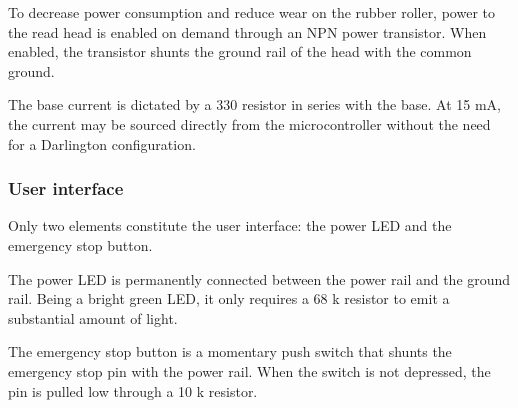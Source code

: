 \documentclass{article}
\begin{document}
	To decrease power consumption and reduce wear on the rubber roller, power
	to the read head is enabled on demand through an NPN power transistor.
	When enabled, the transistor shunts the ground rail of the head with the
	common ground.
	
	The base current is dictated by a 330 \textOmega {} resistor in series with
	the base. At 15 mA, the current may be sourced directly from the
	microcontroller without the need for a Darlington configuration.
	
	\subsubsection{User interface}
	
	Only two elements constitute the user interface: the power LED and the
	emergency stop button.
	
	The power LED is permanently connected between the power rail and the
	ground rail. Being a bright green LED, it only requires a 68 k\textOmega {}
	resistor to emit a substantial amount of light.
	
	The emergency stop button is a momentary push switch that shunts the
	emergency stop pin with the power rail. When the switch is not depressed,
	the pin is pulled low through a 10 k\textOmega {} resistor.
	
\end{document}
